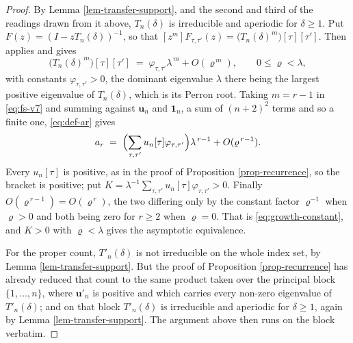 \documentclass[11pt, a4paper, abstract=yes]{scrartcl}
\theoremstyle{definition}
\theoremstyle{remark}
\theoremstyle{plain}
\newcommand{\vek}[1]{\boldsymbol{#1}}
\begin{document}
\begin{proof}
By Lemma \ref{lem-transfer-support}, and the second and third of the readings drawn from it above,
\(T_n(\delta)\) is irreducible and aperiodic for \(\delta\ge1\). Put \(F(z)=(I-zT_n(\delta))^{-1}\), so that
\([z^m]F_{\tau,\tau'}(z)=\bigl(T_n(\delta)^m\bigr)[\tau][\tau']\). Then
\autocite[Theorem V.7]{FlajoletSedgewick2009} applies and gives
\begin{equation}\label{eq:fs-v7}
  \bigl(T_n(\delta)^m\bigr)[\tau][\tau']\;=\;\varphi_{\tau,\tau'}\lambda^{\,m}+O(\varrho^{\,m}),
  \qquad 0\le\varrho<\lambda ,
\end{equation}
with constants \(\varphi_{\tau,\tau'}>0\), the dominant eigenvalue \(\lambda\) there being the
largest positive eigenvalue of \(T_n(\delta)\), which is its Perron root. Taking \(m=r-1\) in
\eqref{eq:fs-v7} and summing against \(\vek u_n\) and \(\vek 1_n\), a sum of \((n+2)^2\) terms and
so a finite one, \eqref{eq:def-ar} gives
\[
  a_r\;=\;\Bigl(\sum_{\tau,\tau'}u_n[\tau]\varphi_{\tau,\tau'}\Bigr)\lambda^{\,r-1}+O(\varrho^{\,r-1}) .
\]
Every \(u_n[\tau]\) is positive, as in the proof of Proposition \ref{prop-recurrence}, so the bracket
is positive; put \(K=\lambda^{-1}\sum_{\tau,\tau'}u_n[\tau]\varphi_{\tau,\tau'}>0\). Finally
\(O(\varrho^{\,r-1})=O(\varrho^{\,r})\), the two differing only by the constant factor
\(\varrho^{-1}\) when \(\varrho>0\) and both being zero for \(r\ge2\) when \(\varrho=0\). That is
\eqref{eq:growth-constant}, and \(K>0\) with \(\varrho<\lambda\) gives the asymptotic equivalence.

For the proper count, \(T'_n(\delta)\) is not irreducible on the whole index set, by
Lemma \ref{lem-transfer-support}. But the proof of Proposition \ref{prop-recurrence} has already
reduced that count to the same product taken over the principal block \(\lbrace1,\dots,n\rbrace\),
where \(\vek u'_n\) is positive and which carries every non-zero eigenvalue of \(T'_n(\delta)\); and
on that block \(T'_n(\delta)\) is irreducible and aperiodic for \(\delta\ge1\), again by
Lemma \ref{lem-transfer-support}. The argument above then runs on the block verbatim.
\end{proof}
\end{document}
